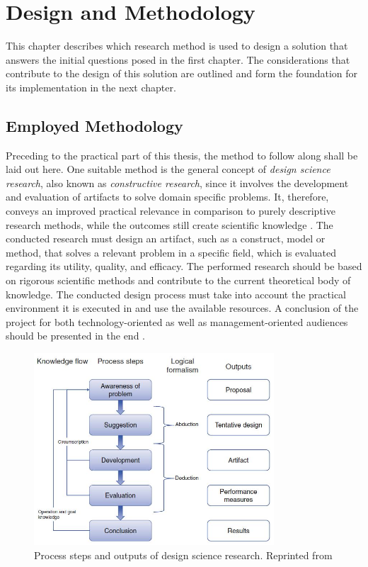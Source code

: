 \chapter{Design and Methodology}
\label{chap:design}
This chapter describes which research method is used to design a solution 
that answers the initial questions posed in the first chapter.
The considerations that contribute to the design of this solution are outlined 
and form the foundation for its implementation in the next chapter.

\section{Employed Methodology}
\label{sec:design:methodology}

Preceding to the practical part of this thesis, 
the method to follow along shall be laid out here.
One suitable method is the general concept of \emph{design science research}, also known as \emph{constructive research}, 
since it involves the development and evaluation of artifacts to solve domain specific problems.
It, therefore, conveys an improved practical relevance in comparison to purely descriptive research methods,
while the outcomes still create scientific knowledge
\autocite[][p.~v]{dresh2015designresearch}.
The conducted research must design an artifact, such as a construct, model or method, that solves a relevant problem in a specific field, which is evaluated regarding its utility, quality, and efficacy.
The performed research should be based on rigorous scientific methods and contribute to the current theoretical body of knowledge.
The conducted design process must take into account the practical environment it is executed in and use the available resources.
A conclusion of the project for both technology-oriented as well as management-oriented audiences should be presented in the end
\autocite[][p.~70]{dresh2015designresearch}.

\begin{figure}[hbt]
	\centering
	\includegraphics[width=0.8\textwidth, keepaspectratio]{resources/designscienceresearchoutputs.jpg}
	\caption[Process steps and outputs of design science research]{\label{fig:design:designscience} Process steps and outputs of design science research. Reprinted from \textcite[][p.~83]{dresh2015designresearch}}
\end{figure}

